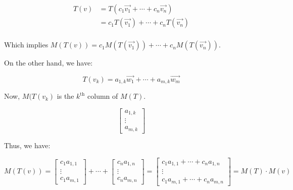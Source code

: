 {	\begin{align*}
		T(v) & = T(c_1 \vec{v_1} + \cdots + c_{n} \vec{v_n})    \\
		     & = c_1 T(\vec{v_1}) + \cdots + c_{n} T(\vec{v_n}) \\
	\end{align*}

	Which implies \(M(T(v)) = c_1 M(T(\vec{v_1})) + \cdots + c_{n} M(T(\vec{v_n}))\).

	On the other hand, we have:

	\[
		T(v_{k}) = a_{1,k} \vec{w_1} + \cdots + a_{m,k} \vec{w_m}
	\]

	Now, \(M(T(v_{k})\) is the \(k^{\text{th}}\) column of \(M(T)\).

	\[
		\begin{bmatrix} a_{1,k} \\ \vdots \\ a_{m,k} \end{bmatrix}
	\]

	Thus, we have:

	\[
		M(T(v)) = \begin{bmatrix} c_1 a_{1,1} \\ \vdots \\ c_1 a_{m,1} \end{bmatrix} + \cdots + \begin{bmatrix} c_{n} a_{1,n} \\ \vdots \\ c_{n} a_{m,n} \end{bmatrix} = \begin{bmatrix} c_1 a_{1,1} + \cdots + c_{n} a_{1,n} \\ \vdots \\ c_1 a_{m,1} + \cdots + c_{n} a_{m,n} \end{bmatrix} = M(T) \cdot M(v)
	\]
}

